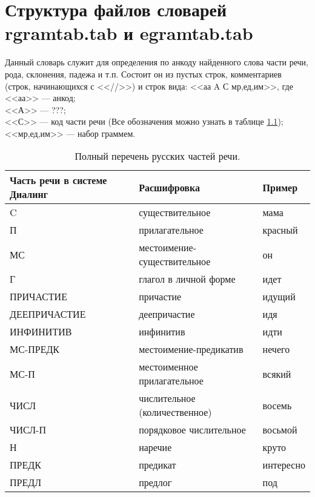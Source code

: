 \documentclass[12pt,a4paper,onecolumn]{report}
\begin{document}
\chapter{Структура файлов словарей rgramtab.tab и egramtab.tab}
Данный словарь служит для определения по анкоду найденного слова части речи, рода, склонения, падежа и т.п.
Состоит он из пустых строк, комментариев (строк, начинающихся с <<//>>) и строк вида: <<аа A С мр,ед,им>>, где\\
<<аа>> --- анкод;\\
<<А>> --- ???;\\
<<С>> --- код части речи (Все обозначения можно узнать в таблице \ref{tabular:partsofspeech});\\
<<мр,ед,им>> --- набор граммем.
\begin{table}[h!]
\caption{Полный перечень русских частей речи.}
\label{tabular:partsofspeech}
\begin{center}
\begin{spacing}{1}
\begin{tabular}{| l | l | l | }
\hline
Часть речи в системе Диалинг & Расшифровка    & Пример\\[2pt] \hline
C             & существительное               & мама\\ \hline
П             & прилагательное                & красный\\ \hline
МС            & местоимение-существительное   & он\\ \hline
Г             & глагол в личной форме         & идет\\ \hline
ПРИЧАСТИЕ     & причастие                     & идущий\\ \hline
ДЕЕПРИЧАСТИЕ  & деепричастие                  & идя\\ \hline
ИНФИНИТИВ     & инфинитив                     & идти\\ \hline
МС-ПРЕДК      & местоимение-предикатив        & нечего\\ \hline
МС-П          & местоименное прилагательное   & всякий\\ \hline
ЧИСЛ          & числительное (количественное) & восемь\\ \hline
ЧИСЛ-П        & порядковое числительное       & восьмой\\ \hline
Н             & наречие                       & круто\\ \hline
ПРЕДК         & предикат                      & интересно\\ \hline
ПРЕДЛ         & предлог                       & под\\ \hline

\end{tabular}
\end{spacing}
\end{center}
\end{table}
\end{document}
